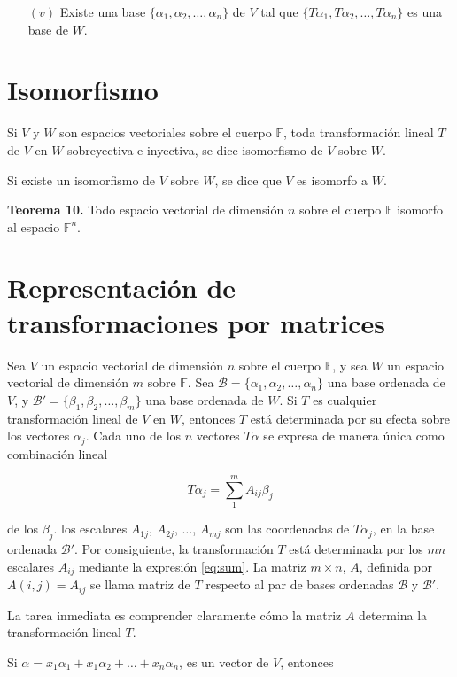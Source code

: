 \newpage

\begin{itemize}
    \item[$(v)$] Existe una base $\{\alpha_{1}, \alpha_{2}, \dots , 
    \alpha_{n}\}$ de $V$ tal que $\{T\alpha_{1}, T\alpha_{2}, \dots ,
    T\alpha_{n}\}$ es una base de $W$.
\end{itemize}

\section{{\Large Isomorﬁsmo}}

Si $V$ y $W$ son espacios vectoriales sobre el cuerpo $\mathbb{F}$,
toda transformación lineal $T$ de $V$ en $W$ sobreyectiva e inyectiva,
se dice isomorﬁsmo de $V$ sobre $W$.

Si existe un isomorﬁsmo de $V$ sobre $W$, se dice que $V$ es isomorfo a $W$.

\textbf{Teorema 10.} Todo espacio vectorial de dimensión $n$ sobre el
cuerpo $\mathbb{F}$ isomorfo al espacio $\mathbb{F}^n$.

\section{{\Large Representación de transformaciones por matrices}}

Sea $V$ un espacio vectorial de dimensión $n$ sobre el cuerpo $\mathbb{F}$,
y sea $W$ un espacio vectorial de dimensión $m$ sobre $\mathbb{F}$.
Sea $\mathcal{B} = \{\alpha_{1}, \alpha_{2}, \dots , \alpha_{n}\}$ una
base ordenada de $V$, y $\mathcal{B}' = \{\beta_{1}, \beta_{2}, \dots ,
\beta_{m}\}$ una base ordenada de $W$. Si $T$ es cualquier transformación
lineal de $V$ en $W$, entonces $T$ está determinada por su efecta
sobre los vectores $\alpha_{j}$. Cada uno de los $n$ vectores $T\alpha$
se expresa de manera única como combinación lineal

\begin{equation}\label{eq:sum}
    T \alpha_{j} = \sum_{1}^{m} A_{ij}\beta_{j}
\end{equation}

de los $\beta_{j}$. los escalares $A_{1j}$, $A_{2j}$, $\dots$, $A_{mj}$ son
las coordenadas de $T\alpha_{j}$, en la base ordenada $\mathcal{B}'$.
Por consiguiente, la transformación $T$ está determinada por los
$mn$ escalares $A_{ij}$ mediante la expresión \eqref{eq:sum}. La matriz $m \times n$,
$A$, deﬁnida por $A(i, j) = A_{ij}$ se llama matriz de $T$ respecto al par
de bases ordenadas $\mathcal{B}$ y $\mathcal{B}'$.

La tarea inmediata es comprender claramente cómo la matriz $A$
determina la transformación lineal $T$.

Si $\alpha = x_{1}\alpha_{1} + x_{1}\alpha_{2} + \dots + x_{n}\alpha_{n}$, es un vector de $V$, entonces

